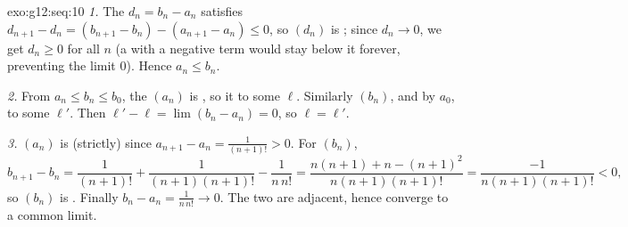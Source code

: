 \begin{solution}{exo:g12:seq:10}
\emph{1.} The  $d_n = b_n - a_n$ satisfies
$d_{n+1} - d_n = (b_{n+1} - b_n) - (a_{n+1} - a_n) \leq 0$, so $(d_n)$ is
; since $d_n \to 0$, we get $d_n \geq 0$ for all $n$ (a 
 with a negative term would stay below it forever, preventing the
limit $0$). Hence $a_n \leq b_n$.

\emph{2.} From $a_n \leq b_n \leq b_0$, the   $(a_n)$ is
, so it  to some $\ell$. Similarly $(b_n)$, 
and  by $a_0$,  to some $\ell'$. Then
$\ell' - \ell = \lim (b_n - a_n) = 0$, so $\ell = \ell'$.

\emph{3.} $(a_n)$ is (strictly)  since
$a_{n+1} - a_n = \frac{1}{(n+1)!} > 0$. For $(b_n)$,
\[
b_{n+1} - b_n = \frac{1}{(n+1)!} + \frac{1}{(n+1)(n+1)!} - \frac{1}{n\,n!}
= \frac{n(n+1) + n - (n+1)^2}{n(n+1)(n+1)!}
= \frac{-1}{n(n+1)(n+1)!} < 0 ,
\]
so $(b_n)$ is . Finally $b_n - a_n = \frac{1}{n\,n!} \to 0$. The
two  are adjacent, hence converge to a common limit.
\end{solution}

